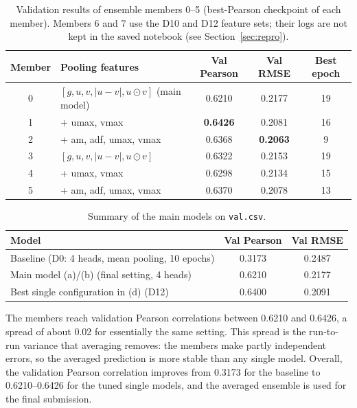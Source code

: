 \documentclass[11pt,a4paper]{article}
\begin{document}
\begin{table}[H]
    \centering
    \caption{Validation results of ensemble members 0--5 (best-Pearson
    checkpoint of each member). Members 6 and 7 use the D10 and D12
    feature sets; their logs are not kept in the saved notebook (see
    Section~\ref{sec:repro}).}
    \label{tab:p2-members}
    \small
    \begin{tabular}{clccc}
        \toprule
        Member & Pooling features & Val Pearson & Val RMSE & Best epoch\\
        \midrule
        0 & $[g,u,v,|u-v|,u\odot v]$ (main model) & 0.6210 & 0.2177 & 19\\
        1 & + umax, vmax              & \textbf{0.6426} & 0.2081 & 16\\
        2 & + am, adf, umax, vmax     & 0.6368 & \textbf{0.2063} & 9\\
        3 & $[g,u,v,|u-v|,u\odot v]$  & 0.6322 & 0.2153 & 19\\
        4 & + umax, vmax              & 0.6298 & 0.2134 & 15\\
        5 & + am, adf, umax, vmax     & 0.6370 & 0.2078 & 13\\
        \bottomrule
    \end{tabular}
\end{table}

\begin{table}[H]
    \centering
    \caption{Summary of the main models on \texttt{val.csv}.}
    \label{tab:p2-summary}
    \begin{tabular}{lcc}
        \toprule
        Model & Val Pearson & Val RMSE\\
        \midrule
        Baseline (D0: 4 heads, mean pooling, 10 epochs) & 0.3173 & 0.2487\\
        Main model (a)/(b) (final setting, 4 heads)      & 0.6210 & 0.2177\\
        Best single configuration in (d) (D12)           & 0.6400 & 0.2091\\
        \bottomrule
    \end{tabular}
\end{table}

The members reach validation Pearson correlations between 0.6210 and
0.6426, a spread of about 0.02 for essentially the same setting. This
spread is the run-to-run variance that averaging removes: the members
make partly independent errors, so the averaged prediction is more
stable than any single model. Overall, the validation Pearson
correlation improves from 0.3173 for the baseline to 0.6210--0.6426 for
the tuned single models, and the averaged ensemble is used for the
final submission.
\end{document}
